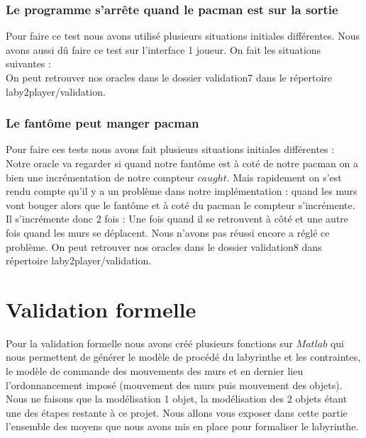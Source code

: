 \subsubsection{Le programme s’arrête quand le pacman est sur la sortie}
Pour faire ce test nous avons utilisé plusieurs situations initiales différentes. Nous avons aussi dû faire ce test sur l'interface 1 joueur. On fait les situations suivantes :\\
%
On peut retrouver nos oracles dans le dossier validation7 dans le répertoire laby2player/validation.\\


\subsubsection{Le fantôme peut manger pacman}
Pour faire ces tests nous avons fait plusieurs situations initiales différentes :\\
Notre oracle va regarder si quand notre fantôme est à coté de notre pacman on a bien une incrémentation de notre compteur $caught$. Mais rapidement on s'est rendu compte qu'il y a un problème dans notre implémentation : quand les murs vont bouger alors que le fantôme et à coté du pacman le compteur s'incrémente. Il s'incrémente donc 2 fois : Une fois quand il se retrouvent à côté et une autre fois quand les murs se déplacent. Nous n'avons pas réussi encore a réglé ce problème. On peut retrouver nos oracles dans le dossier validation8 dans répertoire laby2player/validation.\\


\section{Validation formelle}\label{sec:validationFormelle}
Pour la validation formelle nous avons créé plusieurs fonctions sur $Matlab$ qui nous permettent de générer le modèle de procédé du labyrinthe et les contraintes, le modèle de commande des mouvements des murs et en dernier lieu l'ordonnancement imposé (mouvement des murs puis mouvement des objets). Nous ne faisons que la modélisation 1 objet, la modélisation des 2 objets étant une des étapes restante à ce projet. Nous allons vous exposer dans cette partie l'ensemble des moyens que nous avons mis en place pour formaliser le labyrinthe.

